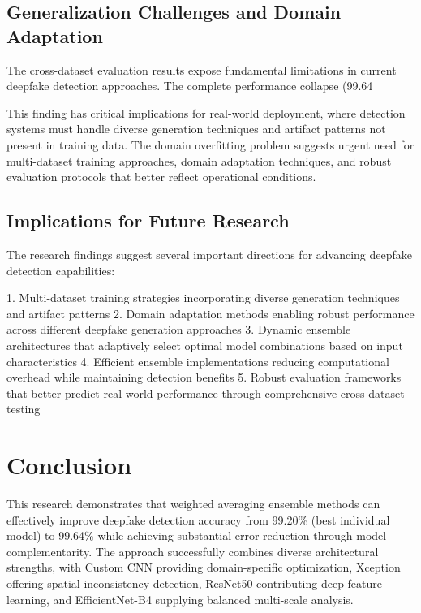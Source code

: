 \documentclass[conference]{IEEEtran}
\begin{document}
\subsection{Generalization Challenges and Domain Adaptation}

The cross-dataset evaluation results expose fundamental limitations in current deepfake detection approaches. The complete performance collapse (99.64%

This finding has critical implications for real-world deployment, where detection systems must handle diverse generation techniques and artifact patterns not present in training data. The domain overfitting problem suggests urgent need for multi-dataset training approaches, domain adaptation techniques, and robust evaluation protocols that better reflect operational conditions.

\subsection{Implications for Future Research}

The research findings suggest several important directions for advancing deepfake detection capabilities:

1. Multi-dataset training strategies incorporating diverse generation techniques and artifact patterns
2. Domain adaptation methods enabling robust performance across different deepfake generation approaches
3. Dynamic ensemble architectures that adaptively select optimal model combinations based on input characteristics
4. Efficient ensemble implementations reducing computational overhead while maintaining detection benefits
5. Robust evaluation frameworks that better predict real-world performance through comprehensive cross-dataset testing

\section{Conclusion}

This research demonstrates that weighted averaging ensemble methods can effectively improve deepfake detection accuracy from 99.20\% (best individual model) to 99.64\% while achieving substantial error reduction through model complementarity. The approach successfully combines diverse architectural strengths, with Custom CNN providing domain-specific optimization, Xception offering spatial inconsistency detection, ResNet50 contributing deep feature learning, and EfficientNet-B4 supplying balanced multi-scale analysis.
\end{document}
